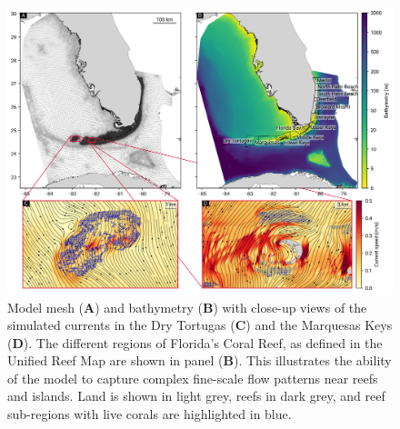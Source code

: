 \documentclass[preprint,12pt,authoryear]{elsarticle}
\begin{document}
\begin{figure}
    \centering
    \includegraphics[width=\textwidth]{figures/fig_mesh_tnc.png}
    \caption{Model mesh (\textbf{A}) and bathymetry (\textbf{B}) with close-up views of the simulated currents in the Dry Tortugas (\textbf{C}) and the Marquesas Keys (\textbf{D}). The different regions of Florida's Coral Reef, as defined in the Unified Reef Map are shown in panel (\textbf{B}). This illustrates the ability of the model to capture complex fine-scale flow patterns near reefs and islands. Land is shown in light grey, reefs in dark grey, and reef sub-regions with live corals are highlighted in blue.}
    \label{fig:mesh}
\end{figure}
\end{document}
